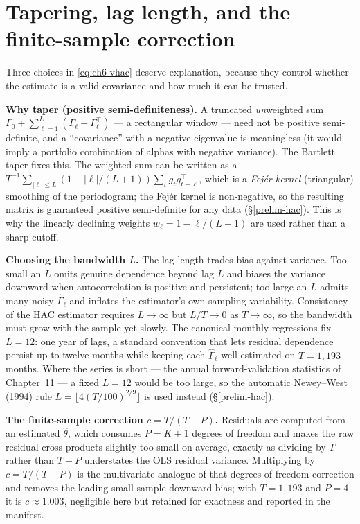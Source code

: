 \section{Tapering, lag length, and the finite-sample correction}\label{ch6-bandwidth}

Three choices in \eqref{eq:ch6-vhac} deserve explanation, because they
control whether the estimate is a valid covariance and how much it can be
trusted.

\textbf{Why taper (positive semi-definiteness).} A truncated \emph{un}weighted
sum $\Gamma_0+\sum_{\ell=1}^{L}(\Gamma_\ell+\Gamma_\ell^{\top})$ --- a
rectangular window --- need not be positive semi-definite, and a
``covariance'' with a negative eigenvalue is meaningless (it would imply a
portfolio combination of alphas with negative variance). The Bartlett taper
fixes this. The weighted sum can be written as a
$T^{-1}\sum_{|\ell|\le L}(1-|\ell|/(L+1))\sum_t g_t g_{t-\ell}^{\top}$, which
is a \emph{Fej\'er-kernel} (triangular) smoothing of the periodogram; the
Fej\'er kernel is non-negative, so the resulting matrix is guaranteed
positive semi-definite for any data (\S\ref{prelim-hac}). This is why the
linearly declining weights $w_\ell=1-\ell/(L+1)$ are used rather than a
sharp cutoff.

\textbf{Choosing the bandwidth $L$.} The lag length trades bias against
variance. Too small an $L$ omits genuine dependence beyond lag $L$ and
biases the variance downward when autocorrelation is positive and
persistent; too large an $L$ admits many noisy $\hat\Gamma_\ell$ and
inflates the estimator's own sampling variability. Consistency of the HAC
estimator requires $L\to\infty$ but $L/T\to0$ as $T\to\infty$, so the
bandwidth must grow with the sample yet slowly. The canonical monthly
regressions fix $L=12$: one year of lags, a standard convention that lets
residual dependence persist up to twelve months while keeping each
$\hat\Gamma_\ell$ well estimated on $T=1{,}193$ months. Where the series is
short --- the annual forward-validation statistics of Chapter~11 --- a fixed
$L=12$ would be too large, so the automatic Newey--West (1994) rule
$L=\lfloor 4(T/100)^{2/9}\rfloor$ is used instead (\S\ref{prelim-hac}).

\textbf{The finite-sample correction $c=T/(T-P)$.} Residuals are computed
from an estimated $\hat\theta$, which consumes $P=K+1$ degrees of freedom
and makes the raw residual cross-products slightly too small on average,
exactly as dividing by $T$ rather than $T-P$ understates the OLS residual
variance. Multiplying by $c=T/(T-P)$ is the multivariate analogue of that
degrees-of-freedom correction and removes the leading small-sample downward
bias; with $T=1{,}193$ and $P=4$ it is $c\approx1.003$, negligible here but
retained for exactness and reported in the manifest.

